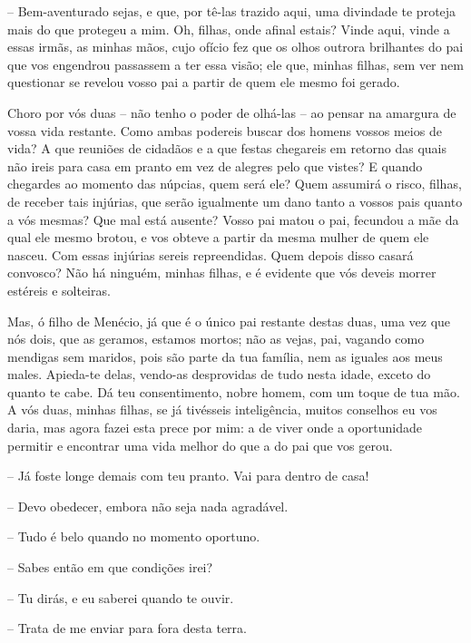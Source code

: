  --   Bem-aventurado sejas, e que, por tê-las trazido aqui, uma divindade te
proteja  mais do que protegeu a mim. Oh, filhas, onde afinal
estais? Vinde aqui, vinde a essas irmãs, as minhas mãos, cujo ofício fez
que os olhos outrora brilhantes do pai que vos engendrou passassem a ter
essa visão; ele que, minhas filhas, sem ver nem questionar se revelou
vosso pai a partir de quem ele mesmo foi gerado.

Choro por vós duas -- não tenho o poder de olhá-las -- ao pensar na
amargura de vossa vida restante. Como ambas podereis buscar dos homens
vossos meios de vida? A  que reuniões de cidadãos e a que festas
chegareis em retorno das quais não ireis para casa em pranto em vez de
alegres pelo que vistes? E quando chegardes ao momento das núpcias, quem
será ele? Quem assumirá o risco, filhas, de receber tais injúrias, que
serão igualmente um dano tanto a vossos pais quanto a vós mesmas? Que
mal está ausente? Vosso pai matou o pai, fecundou a mãe da qual ele
mesmo brotou, e vos obteve a partir da mesma mulher de quem ele nasceu.
Com essas injúrias sereis  repreendidas. Quem depois disso casará
convosco? Não há ninguém, minhas filhas, e é evidente que vós deveis
morrer estéreis e solteiras.

Mas, ó filho de Menécio, já que é o único pai restante destas duas, uma
vez que nós dois, que as geramos, estamos mortos; não as vejas, pai,
vagando como mendigas sem maridos, pois são parte da tua família, nem as
iguales aos meus males. Apieda-te delas, vendo-as desprovidas de tudo
nesta idade, exceto do quanto te cabe. Dá teu  consentimento,
nobre homem, com um toque de tua mão. A vós duas, minhas filhas, se já
tivésseis inteligência, muitos conselhos eu vos daria, mas agora fazei
esta prece por mim: a de viver onde a oportunidade permitir e encontrar
uma vida melhor do que a do pai que vos gerou.

 --   Já foste longe demais com teu pranto. Vai para dentro de casa!

 --   Devo obedecer, embora não seja nada agradável.

 --   Tudo é belo quando no momento oportuno.

 --   Sabes então em que condições irei?

 --   Tu dirás, e eu saberei quando te ouvir.

 --   Trata de me enviar para fora desta terra.

